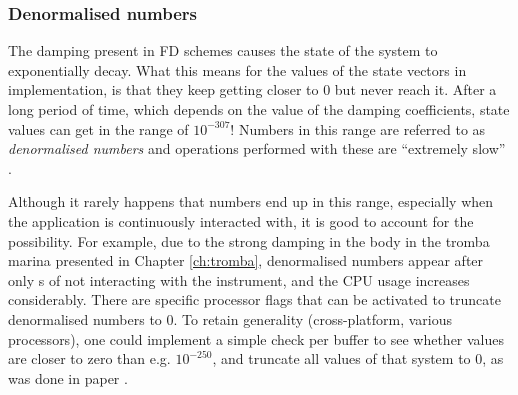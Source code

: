 \subsubsection{Denormalised numbers}
The damping present in FD schemes causes the state of the system to exponentially decay. What this means for the values of the state vectors in implementation, is that they keep getting closer to $0$ but never reach it. 
After a long period of time, which depends on the value of the damping coefficients, state values can get in the range of \textApprox$10^{-307}$! Numbers in this range are referred to as \textit{denormalised numbers} and operations performed with these are ``extremely slow'' \cite{CPPdenormalised}.

Although it rarely happens that numbers end up in this range, especially when the application is continuously interacted with, it is good to account for the possibility. For example, due to the strong damping in the body in the tromba marina presented in Chapter \ref{ch:tromba}, denormalised numbers appear after only  s of not interacting with the instrument, and the CPU usage increases considerably. There are specific processor flags that can be activated to truncate denormalised numbers to 0. To retain generality (cross-platform, various processors), one could implement a simple check per buffer to see whether values are closer to zero than e.g. $10^{-250}$, and truncate all values of that system to $0$, as was done in paper \citeP[D]. 

